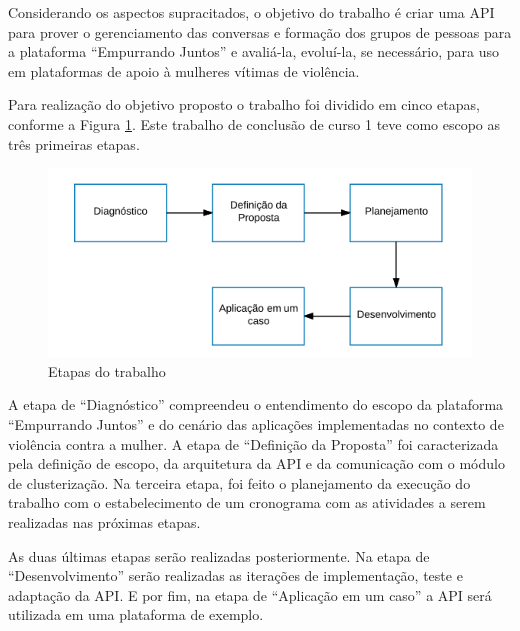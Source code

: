 Considerando os aspectos supracitados, o objetivo do trabalho é criar uma API para prover o gerenciamento das conversas e formação
dos grupos de pessoas para a plataforma ``Empurrando Juntos'' e avaliá-la, evoluí-la, se necessário, para uso 
em plataformas de apoio à mulheres vítimas de violência.



Para realização do objetivo proposto o trabalho foi dividido em cinco etapas, conforme a Figura \ref{fig:etapas_trabalho}. 
Este trabalho de conclusão de curso 1 
teve como escopo as três primeiras etapas.

\begin{figure}[h!]
\centering
\includegraphics[scale=0.6]{figuras/etapas.png}
\caption{Etapas do trabalho}
\label{fig:etapas_trabalho}
\end{figure}

A etapa de ``Diagnóstico'' compreendeu o entendimento do escopo da plataforma ``Empurrando Juntos'' e do cenário das 
aplicações implementadas no contexto de violência contra a mulher. A etapa de ``Definição da Proposta'' foi caracterizada pela definição de escopo, 
da arquitetura da API e da comunicação com o módulo de clusterização. Na terceira etapa, foi feito o planejamento da execução do trabalho com o estabelecimento
de um cronograma com as atividades a serem realizadas nas próximas etapas. 

As duas últimas etapas serão realizadas posteriormente. Na etapa de ``Desenvolvimento''
serão realizadas as iterações de implementação, teste e adaptação da API. E por fim, na etapa de ``Aplicação em um caso'' a API será utilizada em uma 
plataforma de exemplo.


